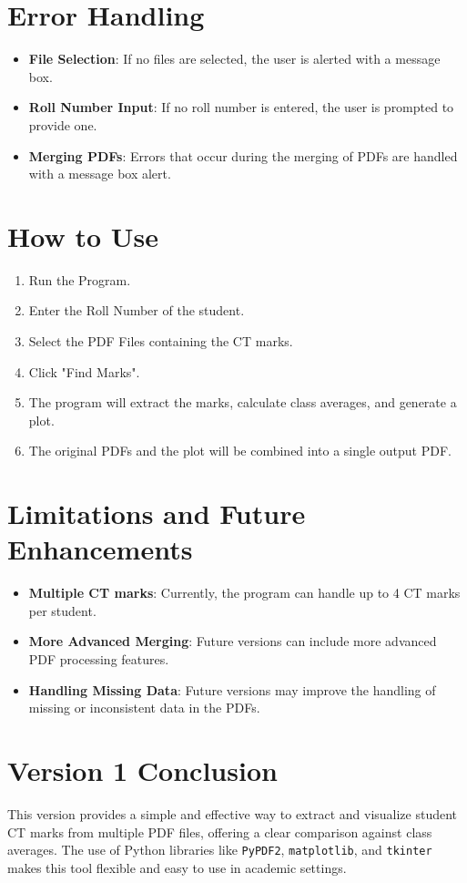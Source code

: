 \documentclass{article}
\begin{document}
\section{Error Handling}

\begin{itemize}
    \item \textbf{File Selection}: If no files are selected, the user is alerted with a message box.
    \item \textbf{Roll Number Input}: If no roll number is entered, the user is prompted to provide one.
    \item \textbf{Merging PDFs}: Errors that occur during the merging of PDFs are handled with a message box alert.
\end{itemize}

\section{How to Use}

\begin{enumerate}
    \item Run the Program.
    \item Enter the Roll Number of the student.
    \item Select the PDF Files containing the CT marks.
    \item Click "Find Marks".
    \item The program will extract the marks, calculate class averages, and generate a plot.
    \item The original PDFs and the plot will be combined into a single output PDF.
\end{enumerate}

\section{Limitations and Future Enhancements}

\begin{itemize}
    \item \textbf{Multiple CT marks}: Currently, the program can handle up to 4 CT marks per student.
    \item \textbf{More Advanced Merging}: Future versions can include more advanced PDF processing features.
    \item \textbf{Handling Missing Data}: Future versions may improve the handling of missing or inconsistent data in the PDFs.
\end{itemize}

\section{Version 1 Conclusion}

This version provides a simple and effective way to extract and visualize student CT marks from multiple PDF files, offering a clear comparison against class averages. The use of Python libraries like \texttt{PyPDF2}, \texttt{matplotlib}, and \texttt{tkinter} makes this tool flexible and easy to use in academic settings.
\end{document}
